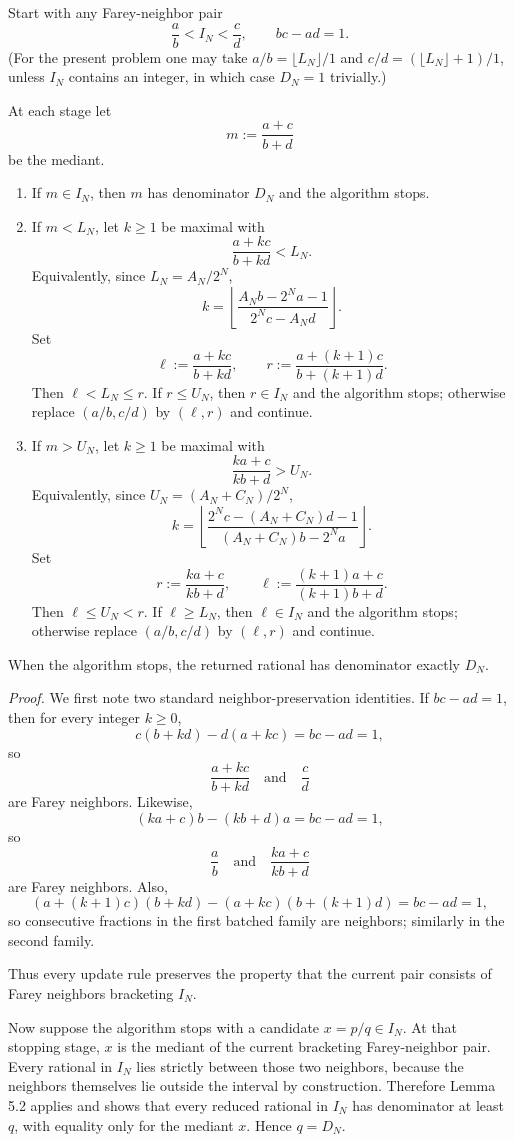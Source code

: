 Start with any Farey-neighbor pair
\[
\frac ab< I_N < \frac cd,
\qquad bc-ad=1.
\]
(For the present problem one may take $a/b=\lfloor L_N\rfloor/1$ and $c/d=(\lfloor L_N\rfloor+1)/1$, unless $I_N$ contains an integer, in which case $D_N=1$ trivially.)

At each stage let
\[
m:=\frac{a+c}{b+d}
\]
be the mediant.

\begin{enumerate}
\item If $m\in I_N$, then $m$ has denominator $D_N$ and the algorithm stops.

\item If $m<L_N$, let $k\ge 1$ be maximal with
\[
\frac{a+kc}{b+kd}<L_N.
\]
Equivalently, since $L_N=A_N/2^N$,
\[
k=
\left\lfloor
\frac{A_N b-2^N a-1}{2^N c-A_N d}
\right\rfloor.
\]
Set
\[
\ell:=\frac{a+kc}{b+kd},\qquad r:=\frac{a+(k+1)c}{b+(k+1)d}.
\]
Then $\ell< L_N\le r$. If $r\le U_N$, then $r\in I_N$ and the algorithm stops; otherwise replace $(a/b,c/d)$ by $(\ell,r)$ and continue.

\item If $m>U_N$, let $k\ge 1$ be maximal with
\[
\frac{ka+c}{kb+d}>U_N.
\]
Equivalently, since $U_N=(A_N+C_N)/2^N$,
\[
k=
\left\lfloor
\frac{2^N c-(A_N+C_N)d-1}{(A_N+C_N)b-2^N a}
\right\rfloor.
\]
Set
\[
r:=\frac{ka+c}{kb+d},\qquad \ell:=\frac{(k+1)a+c}{(k+1)b+d}.
\]
Then $\ell\le U_N<r$. If $\ell\ge L_N$, then $\ell\in I_N$ and the algorithm stops; otherwise replace $(a/b,c/d)$ by $(\ell,r)$ and continue.
\end{enumerate}

When the algorithm stops, the returned rational has denominator exactly $D_N$.

\emph{Proof.}
We first note two standard neighbor-preservation identities. If $bc-ad=1$, then for every integer $k\ge 0$,
\[
c(b+kd)-d(a+kc)=bc-ad=1,
\]
so
\[
\frac{a+kc}{b+kd}\quad\text{and}\quad \frac cd
\]
are Farey neighbors. Likewise,
\[
(ka+c)b-(kb+d)a=bc-ad=1,
\]
so
\[
\frac ab\quad\text{and}\quad \frac{ka+c}{kb+d}
\]
are Farey neighbors. Also,
\[
(a+(k+1)c)(b+kd)-(a+kc)(b+(k+1)d)=bc-ad=1,
\]
so consecutive fractions in the first batched family are neighbors; similarly in the second family.

Thus every update rule preserves the property that the current pair consists of Farey neighbors bracketing $I_N$.

Now suppose the algorithm stops with a candidate $x=p/q\in I_N$. At that stopping stage, $x$ is the mediant of the current bracketing Farey-neighbor pair. Every rational in $I_N$ lies strictly between those two neighbors, because the neighbors themselves lie outside the interval by construction. Therefore Lemma 5.2 applies and shows that every reduced rational in $I_N$ has denominator at least $q$, with equality only for the mediant $x$. Hence $q=D_N$.

